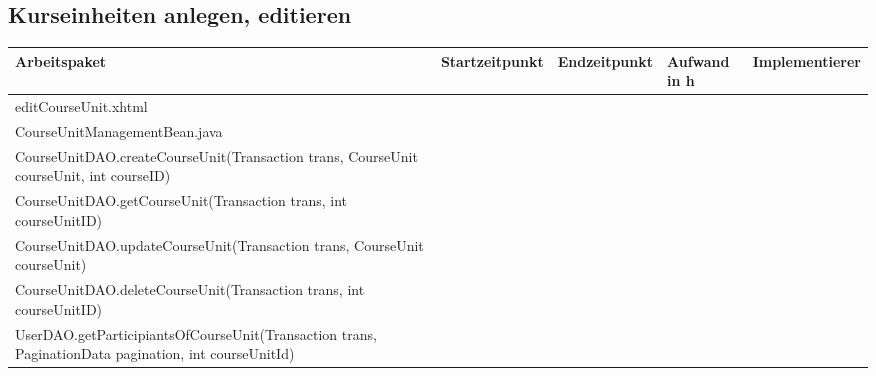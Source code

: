 \begin{landscape}
	\subsection{Kurseinheiten anlegen, editieren}
	\begin{tabular}{|p{10cm}|p{4cm}|p{3cm}|p{3cm}|p{3cm}|}
		\hline  \textbf{Arbeitspaket} & \textbf{Startzeitpunkt} & \textbf{Endzeitpunkt} & \textbf{Aufwand in h} & \textbf{Implementierer} \\ 
		\hline   editCourseUnit.xhtml                                       &                            &                            &                     &\\
		\hline   CourseUnitManagementBean.java                              &                            &                            &                     &\\
		\hline   CourseUnitDAO.createCourseUnit(Transaction trans, CourseUnit courseUnit, int courseID)  &                            &                             &                     &\\ 
		\hline   CourseUnitDAO.getCourseUnit(Transaction trans, int courseUnitID)                        &                            &                             &                     &\\ 
		\hline   CourseUnitDAO.updateCourseUnit(Transaction trans, CourseUnit courseUnit)                &                            &                             &                     &\\ 
		\hline   CourseUnitDAO.deleteCourseUnit(Transaction trans, int courseUnitID)                     &                            &                             &                     &\\ 
		\hline   UserDAO.getParticipiantsOfCourseUnit(Transaction trans, PaginationData pagination, int courseUnitId)&                            &                             &                     &\\ 
		\hline 
	\end{tabular} \ \\
	\ \\
	
\end{landscape}




